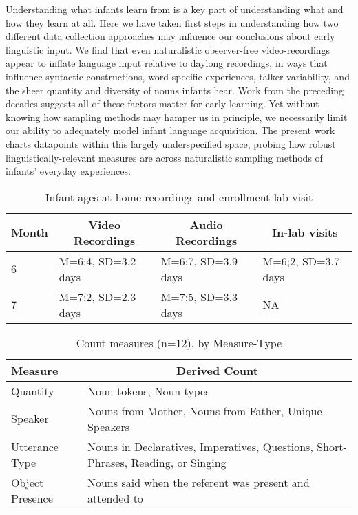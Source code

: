 \documentclass[man]{apa6}
\theoremstyle{definition}
\theoremstyle{definition}
\theoremstyle{definition}
\theoremstyle{remark}
\begin{document}
Understanding what infants learn from is a key part of understanding
what and how they learn at all. Here we have taken first steps in
understanding how two different data collection approaches may influence
our conclusions about early linguistic input. We find that even
naturalistic observer-free video-recordings appear to inflate language
input relative to daylong recordings, in ways that influence syntactic
constructions, word-specific experiences, talker-variability, and the
sheer quantity and diversity of nouns infants hear. Work from the
preceding decades suggests all of these factors matter for early
learning. Yet without knowing how sampling methods may hamper us in
principle, we necessarily limit our ability to adequately model infant
language acquisition. The present work charts datapoints within this
largely underspecified space, probing how robust linguistically-relevant
measures are across naturalistic sampling methods of infants' everyday
experiences.\newpage

\begin{table}[tbp]
\begin{center}
\begin{threeparttable}
\caption{\label{tab:recording-ages-table}Infant ages at home recordings and enrollment lab visit}
\begin{tabular}{llll}
\toprule
Month & \multicolumn{1}{c}{Video Recordings} & \multicolumn{1}{c}{Audio Recordings} & \multicolumn{1}{c}{In-lab visits}\\
\midrule
6 & M=6;4, SD=3.2 days & M=6;7, SD=3.9 days & M=6;2, SD=3.7 days\\
7 & M=7;2, SD=2.3 days & M=7;5, SD=3.3 days & NA\\
\bottomrule
\end{tabular}
\end{threeparttable}
\end{center}
\end{table}

\pagebreak

\begin{table}[tbp]
\begin{center}
\begin{threeparttable}
\caption{\label{tab:measures-tab}Count measures (n=12), by Measure-Type}
\small{
\begin{tabular}{ll}
\toprule
Measure & \multicolumn{1}{c}{Derived Count}\\
\midrule
Quantity & Noun tokens, Noun types\\
Speaker & Nouns from Mother, Nouns from Father, Unique Speakers\\
Utterance Type & Nouns in Declaratives, Imperatives, Questions, Short-Phrases, Reading, or Singing\\
Object Presence & Nouns said when the referent was present and attended to\\
\bottomrule
\end{tabular}
}
\end{threeparttable}
\end{center}
\end{table}
\end{document}
